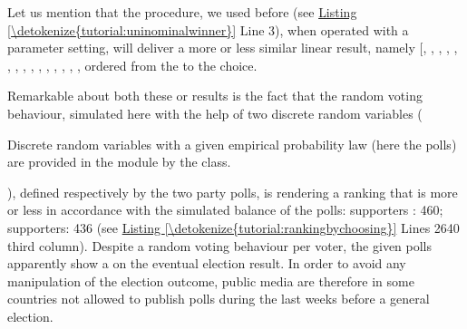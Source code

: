 \documentclass[a4paper,12pt,english]{sphinxhowto}
\begin{document}
Let us mention that the  procedure, we used before (see \hyperref[\detokenize{tutorial:uninominalwinner}]{Listing \ref{\detokenize{tutorial:uninominalwinner}}} Line 3), when operated with a  parameter setting, will deliver a more or less similar  linear  result, namely {[}, , , , , , , , , , , , , , \sphinxstyleemphasis{a06}{]}, ordered from the  to the  choice.

Remarkable about both these  or  results is the fact that the random voting behaviour, simulated here with the help of two discrete random variables (%
\begin{footnote}[16]\sphinxAtStartFootnote
Discrete random variables with a given empirical probability law (here the polls) are provided in the  module by the  class.
%
\end{footnote}), defined respectively by the two party polls, is rendering a ranking that is more or less in accordance with the simulated balance of the polls: \sphinxhyphen{} supporters : 460;   supporters: 436 (see \hyperref[\detokenize{tutorial:rankingbychoosing}]{Listing \ref{\detokenize{tutorial:rankingbychoosing}}} Lines 26\sphinxhyphen{}40 third column). Despite a random voting behaviour per voter, the given polls apparently show a  on the eventual election result. In order to avoid any manipulation of the election outcome, public media are therefore in some countries not allowed to publish polls during the last weeks before a general election.
\end{document}
